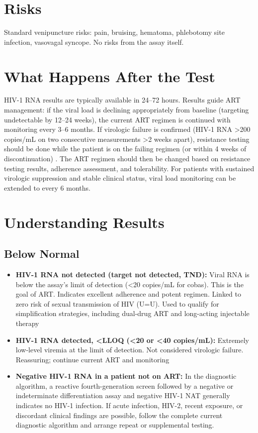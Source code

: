 \section*{Risks}
Standard venipuncture risks: pain, bruising, hematoma, phlebotomy site infection, vasovagal syncope. No risks from the assay itself.

\section*{What Happens After the Test}
HIV-1 RNA results are typically available in 24--72 hours. Results guide ART management: if the viral load is declining appropriately from baseline (targeting undetectable by 12--24 weeks), the current ART regimen is continued with monitoring every 3--6 months. If virologic failure is confirmed (HIV-1 RNA >200 copies/mL on two consecutive measurements >2 weeks apart), resistance testing should be done while the patient is on the failing regimen (or within 4 weeks of discontinuation) \cite{saag2020antiretroviral}. The ART regimen should then be changed based on resistance testing results, adherence assessment, and tolerability. For patients with sustained virologic suppression and stable clinical status, viral load monitoring can be extended to every 6 months.

\section*{Understanding Results}

\subsection*{Below Normal}
\begin{itemize}
  \item \textbf{HIV-1 RNA not detected (target not detected, TND):} Viral RNA is below the assay's limit of detection (<20 copies/mL for cobas). This is the goal of ART. Indicates excellent adherence and potent regimen. Linked to zero risk of sexual transmission of HIV (U=U). Used to qualify for simplification strategies, including dual-drug ART and long-acting injectable therapy
  \item \textbf{HIV-1 RNA detected, <LLOQ (<20 or <40 copies/mL):} Extremely low-level viremia at the limit of detection. Not considered virologic failure. Reassuring; continue current ART and monitoring
  \item \textbf{Negative HIV-1 RNA in a patient not on ART:} In the diagnostic algorithm, a reactive fourth-generation screen followed by a negative or indeterminate differentiation assay and negative HIV-1 NAT generally indicates no HIV-1 infection. If acute infection, HIV-2, recent exposure, or discordant clinical findings are possible, follow the complete current diagnostic algorithm and arrange repeat or supplemental testing.
\end{itemize}

